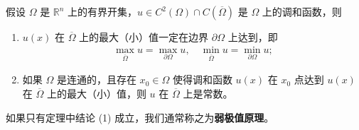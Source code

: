 \documentclass[../../main.tex]{subfiles}%
\begin{document}
\begin{theorem}[强极值原理]\label{theorem:PED-强极值原理}
假设 $\Omega$ 是 $\mathbb{R}^n$ 上的有界开集，$u\in C^2(\Omega)\cap C(\overline{\Omega})$ 是 $\Omega$ 上的调和函数，则
\begin{enumerate}[(1)]
\item $u(x)$ 在 $\overline{\Omega}$ 上的最大（小）值一定在边界 $\partial\Omega$ 上达到，即
\begin{align*}
\max_{\overline{\Omega }} u=\max_{\partial \Omega} u,\quad \min_{\overline{\Omega }} u=\min_{\partial \Omega} u;
\end{align*}
\item 如果 $\Omega$ 是连通的，且存在 $x_0\in\Omega$ 使得调和函数 $u(x)$ 在 $x_0$ 点达到 $u(x)$ 在 $\overline{\Omega}$ 上的最大（小）值，则 $u$ 在 $\overline{\Omega}$ 上是常数。
\end{enumerate}
\end{theorem}
\begin{remark}
如果只有定理中结论 (1) 成立，我们通常称之为\textbf{弱极值原理}。
\end{remark}
\end{document}
